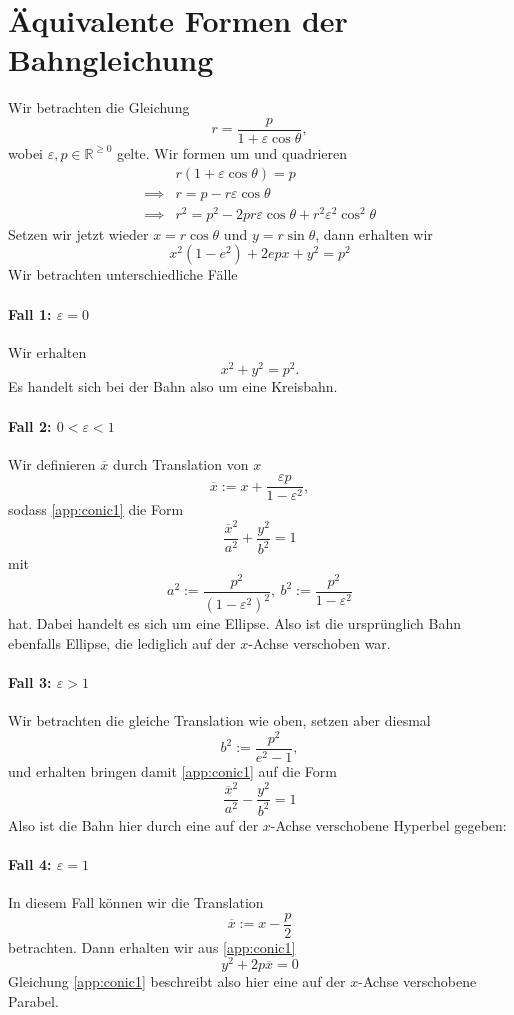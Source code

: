 \section{Äquivalente Formen der Bahngleichung}
Wir betrachten die Gleichung
\[
r = \frac{p}{1+\varepsilon \cos \theta},
\]
wobei $\varepsilon,p\in \mathbb{R}^{\geq 0}$ gelte. Wir formen um und quadrieren
\begin{align*}
& r\left(1+\varepsilon \cos \theta\right) = p \\
\implies& r = p - r \varepsilon \cos \theta \\
\implies& r^2 = p^2 - 2pr\varepsilon\cos \theta + r^2 \varepsilon^2 \cos^2\theta
\end{align*}
Setzen wir jetzt wieder $x=r\cos \theta$ und $y=r\sin \theta$, dann erhalten wir
\begin{equation}\label{app:conic1}
 x^2(1-e^2)+2epx+y^2=p^2
\end{equation}
Wir betrachten unterschiedliche Fälle
\paragraph*{Fall 1: $\varepsilon = 0$}
Wir erhalten
\[
x^2+y^2=p^2.
\]
Es handelt sich bei der Bahn also um eine Kreisbahn.
\paragraph*{Fall 2: $0<\varepsilon<1$}
Wir definieren $\overline{x}$ durch Translation von $x$
\[
\overline{x}:= x+ \frac{\varepsilon p}{1-\varepsilon^2},
\]
sodass \eqref{app:conic1}
die Form
\begin{equation}\label{app:conicel}
\frac{\overline{x}^2}{a^2}+\frac{y^2}{b^2}=1
\end{equation}
mit
\[
a^2 := \frac{p^2}{(1-\varepsilon^2)^2},~b^2:= \frac{p^2}{1-\varepsilon^2}
\]
hat. Dabei handelt es sich um eine Ellipse. Also ist die ursprünglich Bahn ebenfalls Ellipse, die lediglich auf der $x$-Achse verschoben war.
\paragraph*{Fall 3: $\varepsilon>1$}
Wir betrachten die gleiche Translation wie oben, setzen aber diesmal
\[
b^2:= \frac{p^2}{e^2-1},
\]
und erhalten bringen damit \eqref{app:conic1} auf die Form
\begin{equation}\label{app:conichyp}
  \frac{\overline{x}^2}{a^2}-\frac{y^2}{b^2}=1
\end{equation}
Also ist die Bahn hier durch eine auf der $x$-Achse verschobene Hyperbel gegeben:
\paragraph*{Fall 4: $\varepsilon=1$}
In diesem Fall können wir die Translation
\[
\overline{x}:= x-\frac{p}{2}
\]
betrachten.
Dann erhalten wir aus \eqref{app:conic1}
\begin{equation}\label{app:conicpar}
  y^2+2p\overline{x} = 0
\end{equation}
Gleichung \eqref{app:conic1} beschreibt also hier eine auf der $x$-Achse verschobene Parabel.
